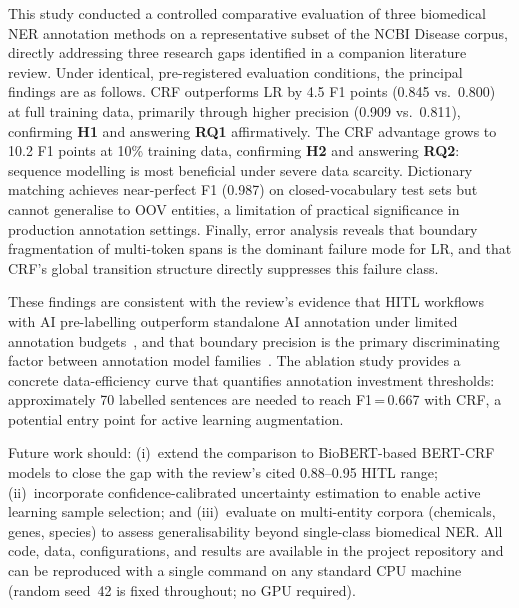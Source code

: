 \documentclass[sigconf,nonacm]{acmart}
\begin{document}
This study conducted a controlled comparative evaluation of three biomedical NER annotation methods on a representative subset of the NCBI Disease corpus, directly addressing three research gaps identified in a companion literature review. Under identical, pre-registered evaluation conditions, the principal findings are as follows. CRF outperforms LR by 4.5 F1 points (0.845 vs.\ 0.800) at full training data, primarily through higher precision (0.909 vs.\ 0.811), confirming \textbf{H1} and answering \textbf{RQ1} affirmatively. The CRF advantage grows to 10.2 F1 points at 10\% training data, confirming \textbf{H2} and answering \textbf{RQ2}: sequence modelling is most beneficial under severe data scarcity. Dictionary matching achieves near-perfect F1 (0.987) on closed-vocabulary test sets but cannot generalise to OOV entities, a limitation of practical significance in production annotation settings. Finally, error analysis reveals that boundary fragmentation of multi-token spans is the dominant failure mode for LR, and that CRF's global transition structure directly suppresses this failure class.

These findings are consistent with the review's evidence that HITL workflows with AI pre-labelling outperform standalone AI annotation under limited annotation budgets~\cite{budd2021}, and that boundary precision is the primary discriminating factor between annotation model families~\cite{hu2024}. The ablation study provides a concrete data-efficiency curve that quantifies annotation investment thresholds: approximately 70 labelled sentences are needed to reach F1\,=\,0.667 with CRF, a potential entry point for active learning augmentation.

Future work should: (i)~extend the comparison to BioBERT-based BERT-CRF models to close the gap with the review's cited 0.88--0.95 HITL range; (ii)~incorporate confidence-calibrated uncertainty estimation to enable active learning sample selection; and (iii)~evaluate on multi-entity corpora (chemicals, genes, species) to assess generalisability beyond single-class biomedical NER. All code, data, configurations, and results are available in the project repository and can be reproduced with a single command on any standard CPU machine (random seed~42 is fixed throughout; no GPU required).



\end{document}
